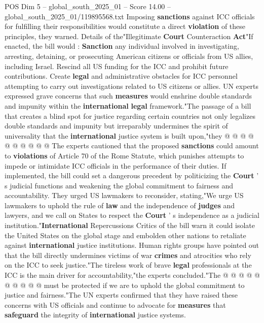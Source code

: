 \begin{textsample}{POS Dim 5 – global\_south\_2025\_01 – Score 14.00 – global\_south\_2025\_01/119895568.txt}
Imposing \textbf{sanctions} against ICC officials for fulfilling their responsibilities would constitute a direct \textbf{violation} of these principles, they warned.
Details of the"Illegitimate \textbf{Court} Counteraction \textbf{Act}"If enacted, the bill would : \textbf{Sanction} any individual involved in investigating, arresting, detaining, or prosecuting American citizens or officials from US allies, including Israel.
Rescind all US funding for the ICC and prohibit future contributions.
Create \textbf{legal} and administrative obstacles for ICC personnel attempting to carry out investigations related to US citizens or allies.
UN experts expressed grave concerns that such \textbf{measures} would enshrine double standards and impunity within the \textbf{international} \textbf{legal} framework."The passage of a bill that creates a blind spot for justice regarding certain countries not only legalizes double standards and impunity but irreparably undermines the spirit of universality that the \textbf{international} justice system is built upon,"they @ @ @ @ @ @ @ @ @ @ The experts cautioned that the proposed \textbf{sanctions} could amount to \textbf{violations} of Article 70 of the Rome Statute, which punishes attempts to impede or intimidate ICC officials in the performance of their duties.
If implemented, the bill could set a dangerous precedent by politicizing the \textbf{Court} ' s judicial functions and weakening the global commitment to fairness and accountability.
They urged US lawmakers to reconsider, stating,"We urge US lawmakers to uphold the rule of \textbf{law} and the independence of \textbf{judges} and lawyers, and we call on States to respect the \textbf{Court} ' s independence as a judicial institution."\textbf{International} Repercussions Critics of the bill warn it could isolate the United States on the global stage and embolden other nations to retaliate against \textbf{international} justice institutions.
Human rights groups have pointed out that the bill directly undermines victims of war \textbf{crimes} and atrocities who rely on the ICC to seek justice."The tireless work of brave \textbf{legal} professionals at the ICC is the main driver for accountability,"the experts concluded."The @ @ @ @ @ @ @ @ @ @ must be protected if we are to uphold the global commitment to justice and fairness."The UN experts confirmed that they have raised these concerns with US officials and continue to advocate for \textbf{measures} that \textbf{safeguard} the integrity of \textbf{international} justice systems.

\end{textsample}
